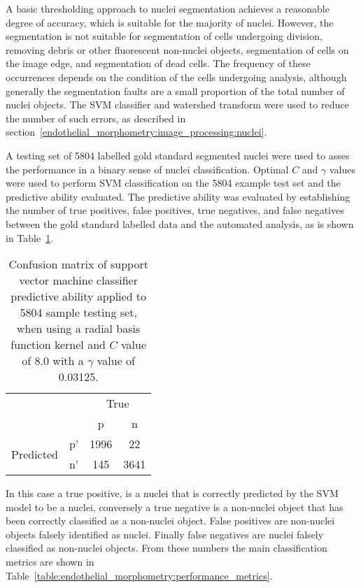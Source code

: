 A basic thresholding approach to nuclei segmentation achieves a reasonable degree of accuracy, which is suitable for the majority of nuclei. However, the segmentation is not suitable for segmentation of cells undergoing division, removing debris or other fluorescent non-nuclei objects, segmentation of cells on the image edge, and segmentation of dead cells. The frequency of these occurrences depends on the condition of the cells undergoing analysis, although generally the segmentation faults are a small proportion of the total number of nuclei objects. The SVM classifier and watershed transform were used to reduce the number of such errors, as described in section~\ref{endothelial_morphometry:image_processing:nuclei}.

A testing set of 5804 labelled gold standard segmented nuclei were used to asses the performance in a binary sense of nuclei classification. Optimal $C$ and $\gamma$ values were used to perform SVM classification on the 5804 example test set and the predictive ability evaluated. The predictive ability was evaluated by establishing the number of true positives, false positives, true negatives, and false negatives between the gold standard labelled data and the automated analysis, as is shown in Table~\ref{table:endothelial_morphometry:confusion_matrix}.

\begin{table}[htbp]
\caption{Confusion matrix of support vector machine classifier predictive ability applied to 5804 sample testing set, when using a radial basis function kernel and $C$ value of 8.0 with a $\gamma$ value of 0.03125. }
\label{table:endothelial_morphometry:confusion_matrix}
\centering
\begin{tabular}{cc|cc}
	\multicolumn{2}{c}{}&\multicolumn{2}{c}{True}\\
	\multicolumn{2}{c|}{}& p & n\\
	\cline{2-4}
	\multirow{2}{*}{Predicted}& p' & 1996 & 22\\ & n' & 145 & 3641\\
\end{tabular}
\end{table}

In this case a true positive, is a nuclei that is correctly predicted by the SVM model to be a nuclei, conversely a true negative is a non-nuclei object that has been correctly classified as a non-nuclei object. False positives are non-nuclei objects falsely identified as nuclei. Finally false negatives are nuclei falsely classified as non-nuclei objects. From these numbers the main classification metrics are shown in Table~\ref{table:endothelial_morphometry:performance_metrics}.

